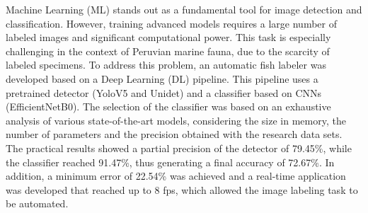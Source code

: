 Machine Learning (ML) stands out as a fundamental tool for image 
detection and classification. However, training advanced models 
requires a large number of labeled images and significant 
computational power. This task is especially challenging in the 
context of Peruvian marine fauna, due to the scarcity of labeled 
specimens. To address this problem, an automatic fish labeler was 
developed based on a Deep Learning (DL) pipeline. This pipeline 
uses a pretrained detector (YoloV5 and Unidet) and a classifier 
based on CNNs (EfficientNetB0). The selection of the classifier 
was based on an exhaustive analysis of various state-of-the-art 
models, considering the size in memory, the number of parameters 
and the precision obtained with the research data sets. The practical 
results showed a partial precision of the detector of 79.45\%, while 
the classifier reached 91.47\%, thus generating a final accuracy of
72.67\%. In addition, a minimum error of 22.54\% was achieved and a 
real-time application was developed that reached up to 8 fps, which 
allowed the image labeling task to be automated.
